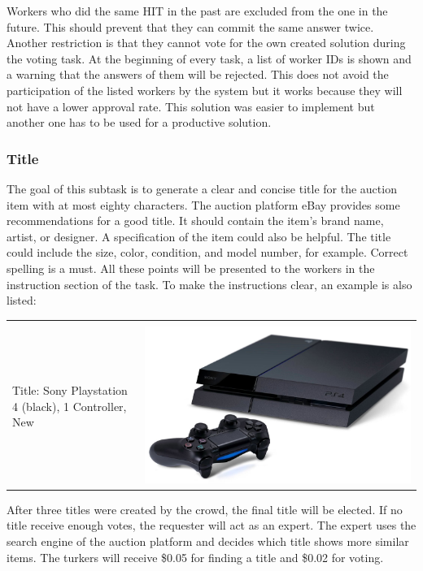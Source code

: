 Workers who did the same HIT in the past are excluded from the one in the future. This should prevent that they can commit the same answer twice. Another restriction is that they cannot vote for the own created solution during the voting task. At the beginning of every task, a list of worker IDs is shown and a warning that the answers of them will be rejected. This does not avoid the participation of the listed workers by the system but it works because they will not have a lower approval rate. This solution was easier to implement but another one has to be used for a productive solution.
\subsubsection{Title}
The goal of this subtask is to generate a clear and concise title for the auction item with at most eighty characters. The auction platform eBay provides some recommendations for a good title. It should contain the item's brand name, artist, or designer. A specification of the item could also be helpful. The title could include the size, color, condition, and model number, for example. Correct spelling is a must. All these points will be presented to the workers in the instruction section of the task. To make the instructions clear, an example is also listed:
\begin{table}[h!]
	\begin{center}
	\begin{tabular}{| p{8cm} p{5cm} |}
		\hline
		& \\
		Title: Sony Playstation 4 (black), 1 Controller, New & \includegraphics[scale=0.1]{images/ps4} \\
		\hline
	\end{tabular}
	\end{center}
\end{table}
After three titles were created by the crowd, the final title will be elected. If no title receive enough votes, the requester will act as an expert. The expert uses the search engine of the auction platform and decides which title shows more similar items. The turkers will receive \$0.05 for finding a title and \$0.02 for voting.
